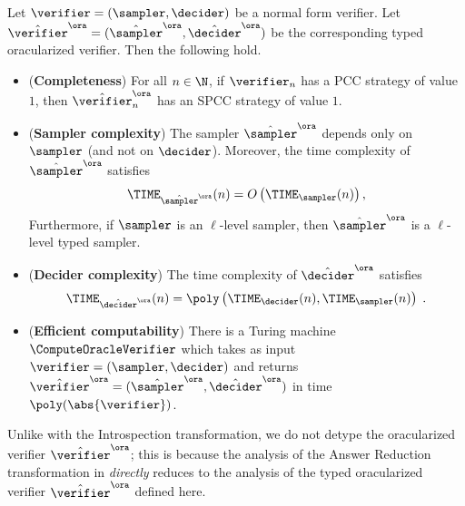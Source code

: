 \begin{theorem}
  \label{thm:oracle-completeness}
  Let $\verifier = (\sampler, \decider)$ be a normal form verifier.
  Let $\tvora = (\tsora,\tdora)$ be the corresponding
  typed oracularized verifier.
  Then the following hold.
  \begin{itemize}
  \item (\textbf{Completeness}) For all $n \in \N$, if $\verifier_n$ has a PCC
    strategy of value $1$, then $\tvora_n$ has an
    SPCC strategy of value $1$.
  
  \item (\textbf{Sampler complexity}) The sampler $\tsora$ depends only
    on $\sampler$ (and not on $\decider$).
    Moreover, the time complexity of $\tsora$ satisfies
    \begin{equation*}
      \TIME_{\tsora}(n) = O \left (\TIME_{\sampler}(n)
      \right),
    \end{equation*}
    Furthermore, if $\sampler$ is an $\ell$-level sampler, then
    $\tsora$ is a $\ell$-level typed sampler.

  \item (\textbf{Decider complexity}) The time complexity of $\tdora$
    satisfies
    \begin{equation*}
      \TIME_{\tdora}(n) = \poly \left (\TIME_{\decider}(n),
        \TIME_\sampler(n) \right)\;.
    \end{equation*}

	\item (\textbf{Efficient computability}) There is a Turing machine
    $\ComputeOracleVerifier$ which takes as input $\verifier =
    (\sampler,\decider)$ and returns $\tvora = ( \tsora,
    \tdora)$ in time $\poly(\abs{\verifier})$.
  \end{itemize}
\end{theorem}


\begin{remark}
Unlike with the Introspection transformation, we do not detype the oracularized verifier $\tvora$; this is because the analysis of the Answer Reduction transformation in  \emph{directly} reduces to the analysis of the typed oracularized verifier $\tvora$ defined here.
\end{remark}

